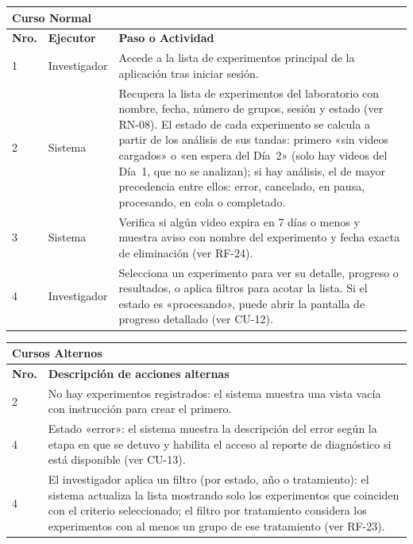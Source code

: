 \noindent
\begin{tabular}{|p{1.0cm}|p{3.7cm}|p{9.5cm}|}
\hline
\multicolumn{3}{|l|}{\textbf{Curso Normal}} \\
\hline
\textbf{Nro.} & \textbf{Ejecutor} & \textbf{Paso o Actividad} \\
\hline
1 & Investigador & Accede a la lista de experimentos principal de la aplicación tras iniciar sesión. \\
\hline
2 & Sistema & Recupera la lista de experimentos del laboratorio con nombre, fecha, número de grupos, sesión y estado (ver RN-08). El estado de cada experimento se calcula a partir de los análisis de sus tandas: primero «sin videos cargados» o «en espera del Día~2» (solo hay videos del Día~1, que no se analizan); si hay análisis, el de mayor precedencia entre ellos: error, cancelado, en pausa, procesando, en cola o completado. \\
\hline
3 & Sistema & Verifica si algún video expira en 7 días o menos y muestra aviso con nombre del experimento y fecha exacta de eliminación (ver RF-24). \\
\hline
4 & Investigador & Selecciona un experimento para ver su detalle, progreso o resultados, o aplica filtros para acotar la lista. Si el estado es «procesando», puede abrir la pantalla de progreso detallado (ver CU-12). \\
\hline
\end{tabular}

\noindent
\begin{tabular}{|p{1.0cm}|p{13.6cm}|}
\hline
\multicolumn{2}{|l|}{\textbf{Cursos Alternos}} \\
\hline
\textbf{Nro.} & \textbf{Descripción de acciones alternas} \\
\hline
2 & No hay experimentos registrados: el sistema muestra una vista vacía con instrucción para crear el primero. \\
\hline
4 & Estado «error»: el sistema muestra la descripción del error según la etapa en que se detuvo y habilita el acceso al reporte de diagnóstico si está disponible (ver CU-13). \\
\hline
4 & El investigador aplica un filtro (por estado, año o tratamiento): el sistema actualiza la lista mostrando solo los experimentos que coinciden con el criterio seleccionado; el filtro por tratamiento considera los experimentos con al menos un grupo de ese tratamiento (ver RF-23). \\
\hline
\end{tabular}

